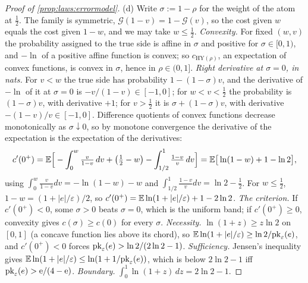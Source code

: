 \begin{proof}[Proof of \cref{prop:laws:errormodel}]
(d) Write $\sigma:=1-\rho$ for the weight of the atom at $\frac12$. The family is symmetric, $\mathcal G(1-v)=1-\mathcal G(v)$, so the cost given $w$ equals the cost given $1-w$, and we may take $w\le\frac12$. \emph{Convexity.} For fixed $(w,v)$ the probability assigned to the true side is affine in $\sigma$ and positive for $\sigma\in[0,1)$, and $-\ln$ of a positive affine function is convex; so $c_{\mathrm{HY}(\rho)}$, an expectation of convex functions, is convex in $\sigma$, hence in $\rho\in(0,1]$. \emph{Right derivative at $\sigma=0$, in nats.} For $v<w$ the true side has probability $1-(1-\sigma)v$, and the derivative of $-\ln$ of it at $\sigma=0$ is $-v/(1-v)\in[-1,0]$; for $w<v<\frac12$ the probability is $(1-\sigma)v$, with derivative $+1$; for $v>\frac12$ it is $\sigma+(1-\sigma)v$, with derivative $-(1-v)/v\in[-1,0]$. Difference quotients of convex functions decrease monotonically as $\sigma\downarrow0$, so by monotone convergence the derivative of the expectation is the expectation of the derivatives:
\[c'(0^+)=\mathbb{E}\Big[-\int_0^w\tfrac{v}{1-v}\,dv+\big(\tfrac12-w\big)-\int_{1/2}^1\tfrac{1-v}{v}\,dv\Big]=\mathbb{E}\big[\ln(1-w)+1-\ln2\big],\]
using $\int_0^w\frac v{1-v}dv=-\ln(1-w)-w$ and $\int_{1/2}^1\frac{1-v}vdv=\ln2-\frac12$. For $w\le\frac12$, $1-w=(1+\lvert e\rvert/\varepsilon)/2$, so $c'(0^+)=\mathbb{E}\ln(1+\lvert e\rvert/\varepsilon)+1-2\ln2$. \emph{The criterion.} If $c'(0^+)<0$, some $\sigma>0$ beats $\sigma=0$, which is the uniform band; if $c'(0^+)\ge0$, convexity gives $c(\sigma)\ge c(0)$ for every $\sigma$. \emph{Necessity.} $\ln(1+z)\ge z\ln2$ on $[0,1]$ (a concave function lies above its chord), so $\mathbb{E}\ln(1+\lvert e\rvert/\varepsilon)\ge\ln2/\mathrm{pk}_\varepsilon(e)$, and $c'(0^+)<0$ forces $\mathrm{pk}_\varepsilon(e)>\ln2/(2\ln2-1)$. \emph{Sufficiency.} Jensen's inequality gives $\mathbb{E}\ln(1+\lvert e\rvert/\varepsilon)\le\ln(1+1/\mathrm{pk}_\varepsilon(e))$, which is below $2\ln2-1$ iff $\mathrm{pk}_\varepsilon(e)>\mathrm e/(4-\mathrm e)$. \emph{Boundary.} $\int_0^1\ln(1+z)\,dz=2\ln2-1$.
\end{proof}

